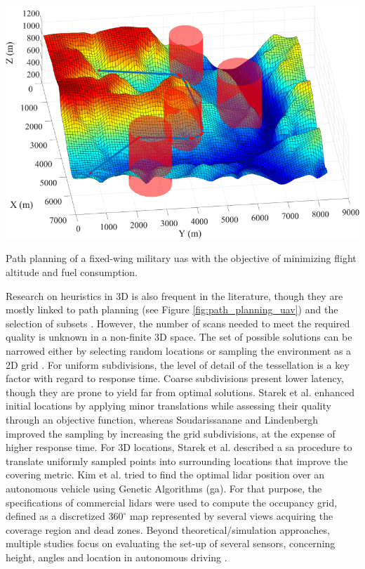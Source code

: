 \begin{marginfigure}[3.0cm]
	\includegraphics{figs/context/uav_path_planning.png}
	\caption{Path planning of a fixed-wing military \acrshort{uas} with the objective of minimizing flight altitude and fuel consumption.}
	\label{fig:path_planning_uav}
\end{marginfigure}
Research on heuristics in 3D is also frequent in the literature, though they are mostly linked to path planning \cite{pehlivanoglu_enhanced_2021, roberge_parallel_2021} (see Figure \ref{fig:path_planning_uav}) and the selection of subsets \cite{pehlivanoglu_enhanced_2021}. However, the number of scans needed to meet the required quality is unknown in a non-finite 3D space. The set of possible solutions can be narrowed either by selecting random locations \cite{chen_indoor_2018} or sampling the environment as a 2D grid \cite{starek_viewshed_2020, giorgini_sensor-based_2019, jia_comparison_2017}. For uniform subdivisions, the level of detail of the tessellation is a key factor with regard to response time. Coarse subdivisions present lower latency, though they are prone to yield far from optimal solutions. Starek et al. \cite{starek_viewshed_2020} enhanced initial locations by applying minor translations while assessing their quality through an objective function, whereas Soudarissanane and Lindenbergh \cite{soudarissanane_optimizing_2012} improved the sampling by increasing the grid subdivisions, at the expense of higher response time. For 3D locations, Starek et al. \cite{starek_viewshed_2020} described a \acrshort{sa} procedure to translate uniformly sampled points into surrounding locations that improve the covering metric. Kim et al. \cite{kim_placement_2020} tried to find the optimal \acrshort{lidar} position over an autonomous vehicle using Genetic Algorithms (\acrshort{ga}). For that purpose, the specifications of commercial \acrshort{lidar}s were used to compute the occupancy grid, defined as a discretized $360^\circ$ map represented by several views acquiring the coverage region and dead zones. Beyond theoretical/simulation approaches, multiple studies focus on evaluating the set-up of several sensors, concerning height, angles and location in autonomous driving \cite{pereira_self_2016, veronese_accurate_2018}. 

